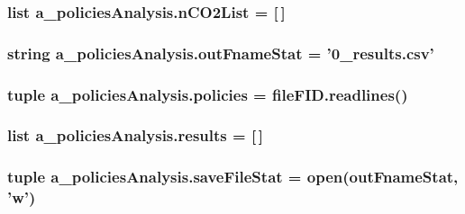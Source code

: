\hypertarget{namespacea__policies_analysis_aa5802e91f6270b0ca7404e7b477825ac}{
\subsubsection[{n\-C\-O2\-List}]{\setlength{\rightskip}{0pt plus 5cm}list a\-\_\-policies\-Analysis.\-n\-C\-O2\-List = \mbox{[}$\,$\mbox{]}}}\label{namespacea__policies_analysis_aa5802e91f6270b0ca7404e7b477825ac}
\hypertarget{namespacea__policies_analysis_a824135f3c0342b50ad20a7dde591f986}{
\subsubsection[{out\-Fname\-Stat}]{\setlength{\rightskip}{0pt plus 5cm}string a\-\_\-policies\-Analysis.\-out\-Fname\-Stat = '0\-\_\-results.\-csv'}}\label{namespacea__policies_analysis_a824135f3c0342b50ad20a7dde591f986}
\hypertarget{namespacea__policies_analysis_a3a38a72cdb77dccad8b92ad3e53b3261}{
\subsubsection[{policies}]{\setlength{\rightskip}{0pt plus 5cm}tuple a\-\_\-policies\-Analysis.\-policies = file\-F\-I\-D.\-readlines()}}\label{namespacea__policies_analysis_a3a38a72cdb77dccad8b92ad3e53b3261}
\hypertarget{namespacea__policies_analysis_aa5c33ed44128c3628bd9816f34c7d7a0}{
\subsubsection[{results}]{\setlength{\rightskip}{0pt plus 5cm}list a\-\_\-policies\-Analysis.\-results = \mbox{[}$\,$\mbox{]}}}\label{namespacea__policies_analysis_aa5c33ed44128c3628bd9816f34c7d7a0}
\hypertarget{namespacea__policies_analysis_ac1eeb171fbc74a3dd7b8f75edb2290e8}{
\subsubsection[{save\-File\-Stat}]{\setlength{\rightskip}{0pt plus 5cm}tuple a\-\_\-policies\-Analysis.\-save\-File\-Stat = open({\bf out\-Fname\-Stat}, 'w')}}\label{namespacea__policies_analysis_ac1eeb171fbc74a3dd7b8f75edb2290e8}
